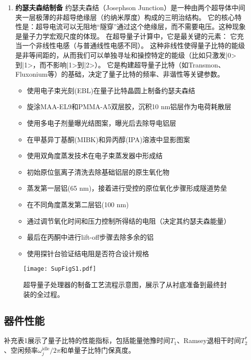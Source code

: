\documentclass[11pt,a4paper]{article}
\begin{document}
\begin{enumerate}
    \item \textbf{约瑟夫森结制备}
        约瑟夫森结（Josephson Junction）是一种由两个超导体中间夹一层极薄的非超导绝缘层（约纳米厚度）构成的三明治结构。
它的核心特性是：超导电流可以无阻地“隧穿”通过这个绝缘层，而不需要电压。这种现象是量子力学宏观尺度的体现。
在超导量子计算中，它是最关键的元素：
它充当一个非线性电感（与普通线性电感不同）。
这种非线性使得量子比特的能级是非等间距的，从而我们可以单独寻址和操控特定的能级（比如只激发|0>到|1>，而不影响|1>到|2>）。
它是构建超导量子比特（如Transmon、Fluxonium等）的基础，决定了量子比特的频率、非谐性等关键参数。
    \begin{itemize}
        \item 使用电子束光刻(EBL)在量子比特晶圆上制备约瑟夫森结
        \item 旋涂MAA-EL9和PMMA-A5双层胶，沉积10 nm铝层作为电荷耗散层
        \item 使用多电子剂量曝光结图案，曝光后去除导电铝层
        \item 在甲基异丁基酮(MIBK)和异丙醇(IPA)溶液中显影图案
        \item 使用双角度蒸发技术在电子束蒸发器中形成结
        \item 初始原位氩离子清洗去除基础铝层的原生氧化物
        \item 蒸发第一层铝(65 nm)，接着进行受控的原位氧化步骤形成隧道势垒
        \item 在不同角度蒸发第二层铝(100 nm)
        \item 通过调节氧化时间和压力控制所得结的电阻（决定其约瑟夫森能量）
        \item 最后在丙酮中进行lift-off步骤去除多余的铝
        \item 使用探针台验证结电阻是否符合设计规格
    \end{itemize}
\end{enumerate}

\begin{figure}[H]
    \centering
    \texttt{[image: SupFigS1.pdf]}
    \caption{超导量子处理器的制备工艺流程示意图，展示了从衬底准备到最终封装的全过程。}
    \label{fig:fabrication_process}
\end{figure}

\subsection{器件性能}

补充表1展示了量子比特的性能指标，包括能量弛豫时间$T_1$、Ramsey退相干时间$T_2^*$、空闲频率$\omega_j^{\text{idle}}/2\pi$和单量子比特门保真度。
\end{document}
